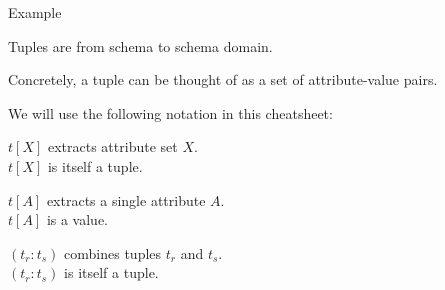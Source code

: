 \begin{multicols}{2}
\begin{CheatsheetEntryFrame}
\begin{RelAlgSubsection}{Example}
\begin{center}
        \end{center}
        \end{RelAlgSubsection}

    \end{CheatsheetEntryFrame}

    \begin{CheatsheetEntryFrame}


        Tuples are  from schema to schema domain.

        Concretely, a tuple can be thought of as a set of attribute-value pairs.

        We will use the following notation in this cheatsheet:
        \begin{psmallindent}
            $t[X]$ extracts attribute set $X$. \\[0mm]
            $t[X]$ is itself a tuple.

            $t[A]$ extracts a single attribute $A$. \\[0mm]
            $t[A]$ is a value. 

            $(t_r : t_s)$ combines tuples $t_r$ and $t_s$. \\[0mm]
            $(t_r : t_s)$ is itself a tuple.
        \end{psmallindent}

    \end{CheatsheetEntryFrame}

\end{multicols}
\newpage
